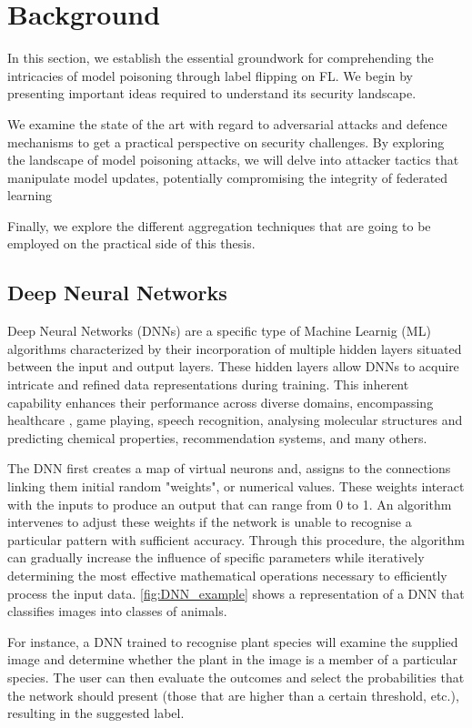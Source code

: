 \section{Background} \label{sec:background}
In this section, we establish the essential groundwork for comprehending the intricacies of model poisoning through label flipping on FL. We begin by presenting important ideas required to understand its security landscape.

We examine the state of the art with regard to adversarial attacks and defence mechanisms to get a practical perspective on security challenges. 
By exploring the landscape of model poisoning attacks, we will delve into attacker tactics that manipulate model updates, potentially compromising the integrity of federated learning

Finally, we explore the different aggregation techniques that are going to be employed on the practical side of this thesis.

\subsection{Deep Neural Networks}
Deep Neural Networks (DNNs) are a specific type of Machine Learnig (ML) algorithms characterized by their incorporation of multiple hidden layers situated between the input and output layers. These hidden layers allow DNNs to acquire intricate and refined data representations during training. This inherent capability enhances their performance across diverse domains, encompassing healthcare \cite{BreastCancerComputerVision}, game playing, speech recognition, analysing molecular structures and predicting chemical properties, recommendation systems, and many others.

The DNN first creates a map of virtual neurons and, assigns to the connections linking them initial random "weights", or numerical values. These weights interact with the inputs to produce an output that can range from 0 to 1. An algorithm intervenes to adjust these weights if the network is unable to recognise a particular pattern with sufficient accuracy. Through this procedure, the algorithm can gradually increase the influence of specific parameters while iteratively determining the most effective mathematical operations necessary to efficiently process the input data. \autoref{fig:DNN_example} shows a representation of a DNN that classifies images into classes of animals.

For instance, a DNN trained to recognise plant species will examine the supplied image and determine whether the plant in the image is a member of a particular species. The user can then evaluate the outcomes and select the probabilities that the network should present (those that are higher than a certain threshold, etc.), resulting in the suggested label.

